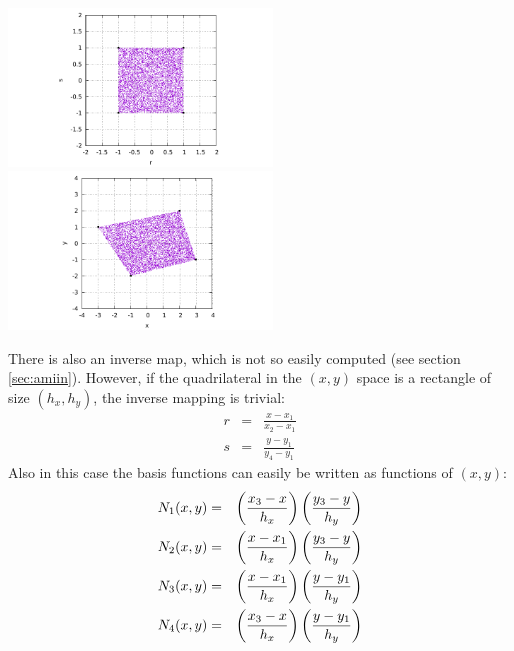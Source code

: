 \begin{center}
\includegraphics[width=7cm]{images/mappings/bilinear/rs.pdf}
\includegraphics[width=7cm]{images/mappings/bilinear/xy.pdf}
\end{center}

There is also an inverse map, which is not so easily computed (see section \ref{sec:amiin}).
However, if the quadrilateral in the $(x,y)$ space is a rectangle of size $(h_x,h_y)$, 
the inverse mapping is trivial:
\begin{eqnarray}
r&=&\frac{x-x_1}{x_2-x_1} \\
s&=&\frac{y-y_1}{y_4-y_1} 
\end{eqnarray}
Also in this case the basis functions can easily be written as functions of $(x,y)$:
\begin{eqnarray}
N_1(x,y) &=& \left( \frac{x_3 -x }{h_x}  \right) \left( \frac{y_3 -y }{h_y}  \right) \nonumber\\
N_2(x,y) &=& \left( \frac{x - x_1}{h_x}  \right) \left( \frac{y_3 -y }{h_y}  \right) \nonumber\\
N_3(x,y) &=& \left( \frac{x - x_1}{h_x}  \right) \left( \frac{y - y_1}{h_y}  \right) \nonumber\\
N_4(x,y) &=& \left( \frac{x_3 -x }{h_x}  \right) \left( \frac{y - y_1}{h_y}  \right) \nonumber 
\end{eqnarray}

